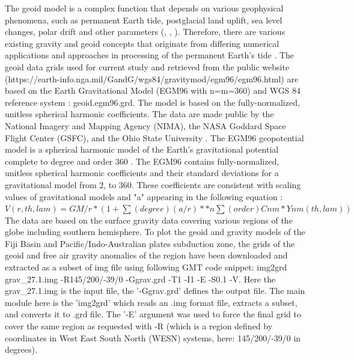 \documentclass[USenglish]{article}
\begin{document}
The geoid model is a complex function that depends on various geophysical phenomena, such as permanent Earth tide, postglacial land uplift, sea level changes, polar drift and other parameters (\cite{Ekman1995}, \cite{Bursa1995}, \cite{Heiskanen}). Therefore, there are various existing gravity and geoid concepts that originate from differing numerical applications and approaches in processing of the permanent Earth's tide \citep{Ekman1989}. The geoid data grids used for current study and retrieved from the public website (https://earth-info.nga.mil/GandG/wgs84/gravitymod/egm96/egm96.html) are based on the Earth Gravitational Model (EGM96 with n=m=360) and WGS 84 reference system \citep{Malys1996}: geoid.egm96.grd. The model is based on the fully-normalized, unitless spherical harmonic coefficients. The data are made public by the National Imagery and Mapping Agency (NIMA), the NASA Goddard Space Flight Center (GSFC), and the Ohio State University \citep{Rapp}. The EGM96 geopotential model is a spherical harmonic model of the Earth's gravitational potential complete to degree and order 360 \citep{Lemoineetal1998}. The EGM96 contains fully-normalized, unitless spherical harmonic coefficients and their standard deviations for a gravitational model from 2\degree , to 360\degree. These coefficients are consistent with scaling values of gravitational models and "a" appearing in 
the following equation \citep{Rapp1994}: \\
$V(r,th,lam)=GM/r*(1+\sum(degree)(a/r)**n \sum(order) Cnm*Ynm(th,lam))$ \\
The data are based on the surface gravity data covering various regions of the globe including southern hemisphere. To plot the geoid and gravity models of the Fiji Basin and Pacific/Indo-Australian plates subduction zone, the grids of the geoid and free air gravity anomalies of the region have been downloaded and extracted as a subset of img file using following GMT code snippet: img2grd grav\_27.1.img -R145/200/-39/0 -Ggrav.grd -T1 -I1 -E -S0.1 -V. Here the grav\_27.1.img is the input file, the '-Ggrav.grd' defines the output file. The main module here is the 'img2grd' which reads an .img format file, extracts a subset, and converts it to .grd file. The '-E' argument was used to force the final grid to cover the same region as requested with -R (which is a  region defined by coordinates in West East South North (WESN) systems, here: 145/200/-39/0 in degrees). \\
\end{document}
